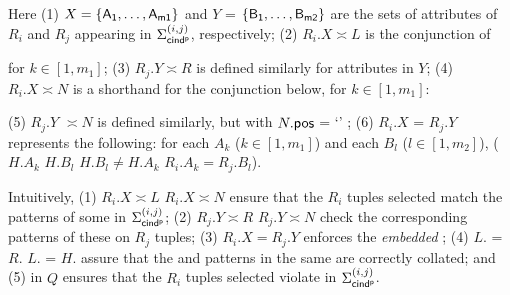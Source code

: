 \noindent Here (1) $X = \{\protect\mathsf{A_1,\dots, A_{m1}}\}$ and $Y$ =
$\{\protect\mathsf{B_1,\dots, B_{m2}}\}$ are the sets of attributes of $R_i$ and
 $R_j$ appearing in $\Sigma_{{\mathsf{cind^p}}}^{(i,j)}$, respectively;
(2) $R_i.X\asymp L$ is the conjunction of


\begin{footnotesize}
\end{footnotesize}

\noindent
for $k\in[1, m_1]$;
(3) $R_j.Y\asymp R$ is defined similarly for attributes
 in $Y$;
(4) $R_i.X\asymp N$ is a shorthand for the conjunction below,
for $k\in[1, m_1]$:

\begin{footnotesize}
\end{footnotesize}

\noindent
(5) $R_j.Y$ $\asymp N$ is defined similarly,
but with $N.\protect\mathsf{pos}$ = `\RHS' ; (6) $R_i.X$
  = $R_j.Y$ represents the following:
for each $A_k$  ($k\in[1, m_1]$) and each $B_l$ ($l\in[1, m_2]$),
($H.A_k$ 
 $H.B_l$   $H.B_l \ne H.A_k$   $R_i.A_k
= R_j.B_l$).



Intuitively, (1) $R_i.X\asymp L$  $R_i.X\asymp N$ ensure
that the $R_i$ tuples selected match the \LHS patterns of some
\pCINDs in  $\Sigma_{{\mathsf{cind^p}}}^{(i,j)}$;
(2) $R_j.Y\asymp R$  $R_j.Y\asymp N$ check the corresponding
 \RHS patterns of these \pCINDs on
$R_j$ tuples;
(3) $R_i.X = R_j.Y$ enforces the
{\em embedded} \INDs; (4) $L$. = $R$.
 $L$. = $H$. assure that the \LHS and
\RHS patterns in the same \pCIND are correctly collated; and (5)  in $Q$ ensures that the $R_i$ tuples selected violate
\pCINDs in $\Sigma_{{\mathsf{cind^p}}}^{(i,j)}$.


